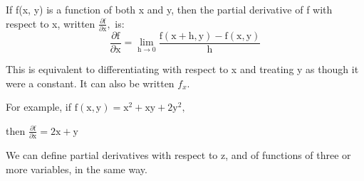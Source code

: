 If f(x, y) is a function of both x and y, then the partial derivative of
f with respect to x, written $ \frac{\partial \mathrm{f}}{\partial \mathrm{x}}, $ is:
\[ \frac{\partial \mathrm{f}}{\partial \mathrm{x}}
= \lim_{\mathrm{h} \to 0} \frac {\mathrm{f(x + h, y) - f(x, y)}}{\mathrm{h}} \]
\par
This is equivalent to differentiating with respect to x and treating y as though
it were a constant. It can also be written $f_{x}.$ 
\par
For example, if $ \mathrm{f(x, y)} = \mathrm{x}^2 + \mathrm{xy} + 2 \mathrm{y}^2, $ 
\par
then $ \frac{\partial \mathrm{f}}{\partial \mathrm{x}} = 2 \mathrm{x + y} $
\par
We can define partial derivatives with respect to z, and of functions of 
three or more variables, in the same way.